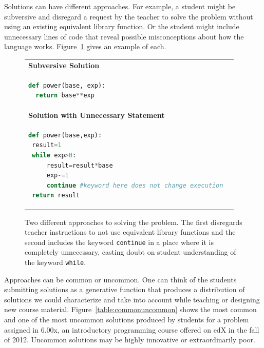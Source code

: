\documentclass[12pt,twoside]{mitthesis}
\begin{document}
Solutions can have different approaches. For example, a student might be subversive and disregard a request by the teacher to solve the problem without using an existing equivalent library function. Or the student might include unnecessary lines of code that reveal possible misconceptions about how the language works. Figure~\ref{table:morediffapproaches} gives an example of each.

\begin{figure}
\begin{tabular}{ll}
{\bf Subversive Solution} &  \\
\begin{minipage}{0.5\linewidth}
\begin{lstlisting}[basicstyle=\linespread{1.0}\ttfamily\footnotesize,language=python]
def power(base, exp):
  return base**exp
\end{lstlisting}
\end{minipage}
& \\

{\bf Solution with Unnecessary Statement} & \\
\begin{minipage}{1.0\linewidth}
\begin{lstlisting}[basicstyle=\linespread{1.0}\ttfamily\footnotesize,language=python]
def power(base,exp):
 result=1
 while exp>0:
     result=result*base
     exp-=1
     continue #keyword here does not change execution
 return result
\end{lstlisting}
\end{minipage} 
\end{tabular}
\caption{Two different approaches to solving the problem. The first disregards teacher instructions to not use equivalent library functions and the second includes the keyword \texttt{continue} in a place where it is completely unnecessary, casting doubt on student understanding of the keyword \texttt{while}.}
\label{table:morediffapproaches}
\end{figure}

Approaches can be common or uncommon. One can think of the students submitting solutions as a generative function that produces a distribution of solutions we could characterize and take into account while teaching or designing new course material. Figure~\ref{table:commonuncommon} shows the most common and one of the most uncommon solutions produced by students for a problem assigned in 6.00x, an introductory programming course offered on edX in the fall of 2012. Uncommon solutions may be highly innovative or extraordinarily poor.
\end{document}
